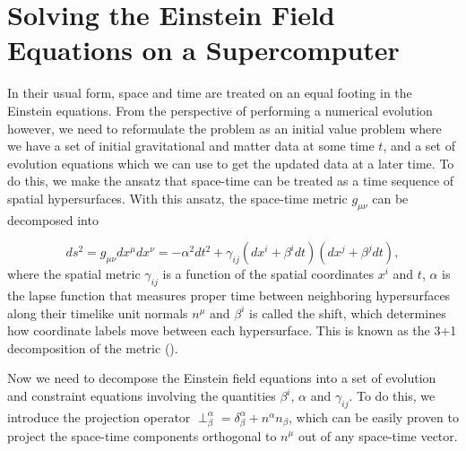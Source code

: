 \section{Solving the Einstein Field Equations on a Supercomputer}

In their usual form, space and time are treated on an equal footing in the Einstein equations. From the perspective of performing a numerical evolution however, we need to reformulate the problem as an initial value problem where we have a set of initial gravitational and matter data at some time $t$, and a set of evolution equations which we can use to get the updated data at a later time. To do this, we make the ansatz that space-time can be treated as a time sequence of spatial hypersurfaces. With this ansatz, the space-time metric $g_{\mu\nu}$ can be decomposed into

\begin{equation}
\label{eq:4}
ds^{2} = g_{\mu\nu}dx^{\mu}dx^{\nu} = -\alpha^2dt^2 + \gamma_{ij}(dx^i+\beta^idt)(dx^j+\beta^jdt),
\end{equation}
%
where the spatial metric $\gamma_{ij}$ is a function of the spatial coordinates $x^{i}$ and $t$, $\alpha$ is the lapse function that measures proper time between neighboring hypersurfaces along their timelike unit normals $n^{\mu}$ and $\beta^i$ is called the shift, which determines how coordinate labels move between each hypersurface. This is known as the 3+1 decomposition of the metric (\cite{arnowitt1959dynamical}).

Now we need to decompose the Einstein field equations into a set of evolution and constraint equations involving the quantities $\beta^i$, $\alpha$ and $\gamma_{ij}$. To do this, we introduce the projection operator $\perp^{\alpha}_{\beta} = \delta^{\alpha}_{\beta} + n^{\alpha} n_{\beta}$, which can be easily proven to project the space-time components orthogonal to $n^{\mu}$ out of any space-time vector.

